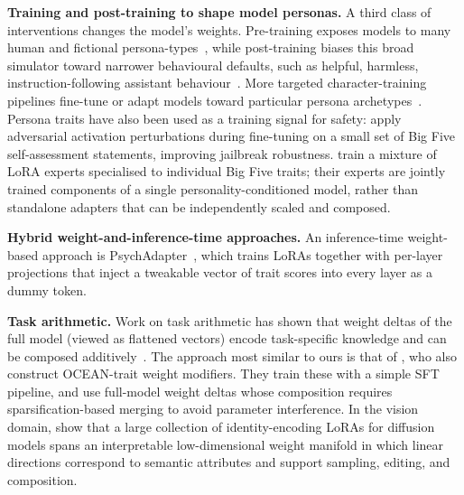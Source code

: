 \textbf{Training and post-training to shape model personas.}
A third class of interventions changes the model's weights. Pre-training exposes models to many human and fictional persona-types~\citep{tice2026alignmentpretraining, shanahan2023role}, while post-training biases this broad simulator toward narrower behavioural defaults, such as helpful, harmless, instruction-following assistant behaviour~\citep{ouyang2022instructgpt, bai2022constitutional, lu2026assistant}. More targeted character-training pipelines fine-tune or adapt models toward particular persona archetypes~\citep{maiya2025opencharacter, li2025big5}. Persona traits have also been used as a training signal for safety: \citet{merzouk2026latentpersonality} apply adversarial activation perturbations during fine-tuning on a small set of Big Five self-assessment statements, improving jailbreak robustness. \citet{dan2024preact} train a mixture of LoRA experts specialised to individual Big Five traits; their experts are jointly trained components of a single personality-conditioned model, rather than standalone adapters that can be independently scaled and composed.

\textbf{Hybrid weight-and-inference-time approaches.} An inference-time weight-based approach is PsychAdapter~\citep{vu2026psychadapter}, which trains LoRAs together with per-layer projections that inject a tweakable vector of trait scores into every layer as a dummy token.

\textbf{Task arithmetic.} Work on task arithmetic has shown that weight deltas of the full model (viewed as flattened vectors) encode task-specific knowledge and can be composed additively~\citep{ilharco2023editing,huang2024chatvectorsimpleapproach}. The approach most similar to ours is that of \citet{sun2025personalityvectormodulatingpersonality}, who also construct OCEAN-trait weight modifiers. They train these with a simple SFT pipeline, and use full-model weight deltas whose composition requires sparsification-based merging to avoid parameter interference. In the vision domain, \citet{dravid2024interpreting} show that a large collection of identity-encoding LoRAs for diffusion models spans an interpretable low-dimensional weight manifold in which linear directions correspond to semantic attributes and support sampling, editing, and composition.
